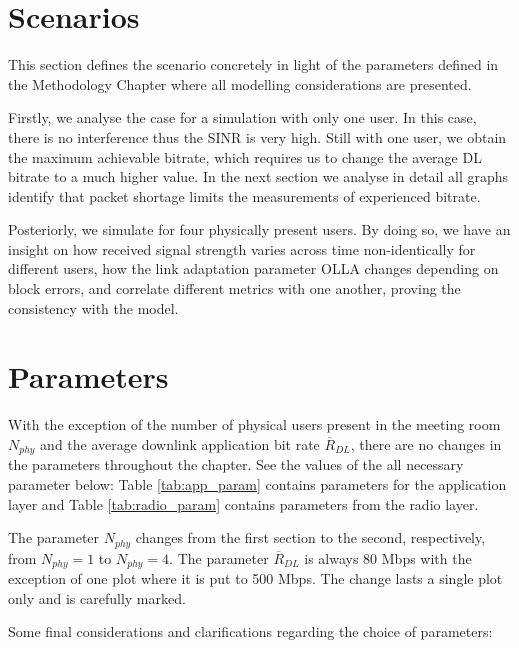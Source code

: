 \section{Scenarios}
\label{sec:scenarios}

This section defines the scenario concretely in light of the parameters defined in the Methodology Chapter where all modelling considerations are presented. 

Firstly, we analyse the case for a simulation with only one user. In this case, there is no interference thus the \ac{SINR} is very high. Still with one user, we obtain the maximum achievable bitrate, which requires us to change the average DL bitrate to a much higher value. In the next section we analyse in detail all graphs identify that packet shortage limits the measurements of experienced bitrate.

Posteriorly, we simulate for four physically present users. By doing so, we have an insight on how received signal strength varies across time non-identically for different users, how the link adaptation parameter \ac{OLLA} changes depending on block errors, and correlate different metrics with one another, proving the consistency with the model.

\section*{Parameters}

With the exception of the number of physical users present in the meeting room $N_{phy}$ and the average downlink application bit rate $\overline{R}_{DL}$, there are no changes in the parameters throughout the chapter. See the values of the all necessary parameter below: Table \ref{tab:app_param} contains parameters for the application layer and Table \ref{tab:radio_param} contains parameters from the radio layer. 

The parameter $N_{phy}$ changes from the first section to the second, respectively, from $N_{phy} = 1$ to $N_{phy} = 4$. The parameter $\overline{R}_{DL}$ is always 80 Mbps with the exception of one plot where it is put to 500 Mbps. The change lasts a single plot only and is carefully marked.

Some final considerations and clarifications regarding the choice of parameters:

